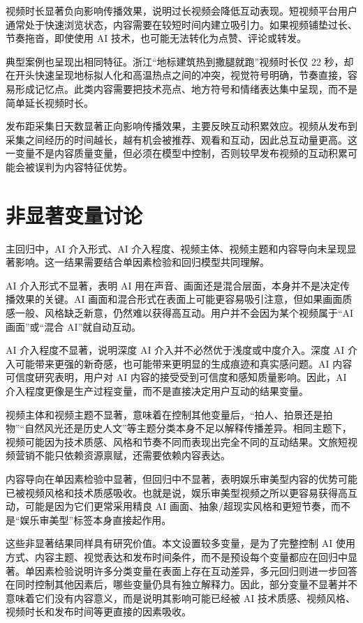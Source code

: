 视频时长显著负向影响传播效果，说明过长视频会降低互动表现。短视频平台用户通常处于快速浏览状态，内容需要在较短时间内建立吸引力。如果视频铺垫过长、节奏拖沓，即使使用 AI 技术，也可能无法转化为点赞、评论或转发。

典型案例也呈现出相同特征。浙江“地标建筑热到撒腿就跑”视频时长仅 22 秒，却在开头快速呈现地标拟人化和高温热点之间的冲突，视觉符号明确，节奏直接，容易形成记忆点。此类内容需要把技术亮点、地方符号和情绪表达集中呈现，而不是简单延长视频时长。

发布距采集日天数显著正向影响传播效果，主要反映互动积累效应。视频从发布到采集之间经历的时间越长，越有机会被推荐、观看和互动，因此总互动量更高。这一变量不是内容质量变量，但必须在模型中控制，否则较早发布视频的互动积累可能会被误判为内容特征优势。

\section{非显著变量讨论}

主回归中，AI 介入形式、AI 介入程度、视频主体、视频主题和内容导向未呈现显著影响。这一结果需要结合单因素检验和回归模型共同理解。

AI 介入形式不显著，表明 AI 用在声音、画面还是混合层面，本身并不是决定传播效果的关键。AI 画面和混合形式在表面上可能更容易吸引注意，但如果画面质感一般、风格缺乏新意，仍然难以获得高互动。用户并不会因为某个视频属于“AI 画面”或“混合 AI”就自动互动。

AI 介入程度不显著，说明深度 AI 介入并不必然优于浅度或中度介入。深度 AI 介入可能带来更强的新奇感，也可能带来更明显的生成痕迹和真实感问题。AI 内容可信度研究表明，用户对 AI 内容的接受受到可信度和感知质量影响\cite{lit14}。因此，AI 介入程度更像是生产过程变量，而不是直接决定用户互动的结果变量。

视频主体和视频主题不显著，意味着在控制其他变量后，“拍人、拍景还是拍物”“自然风光还是历史人文”等主题分类本身不足以解释传播差异。相同主题下，视频可能因为技术质感、风格和节奏不同而表现出完全不同的互动结果。文旅短视频营销不能只依赖资源禀赋，还需要依赖内容表达。

内容导向在单因素检验中显著，但回归中不显著，表明娱乐审美型内容的优势可能已被视频风格和技术质感吸收。也就是说，娱乐审美型视频之所以更容易获得高互动，可能是因为它们更常采用精良 AI 画面、抽象/超现实风格和更短节奏，而不是“娱乐审美型”标签本身直接起作用。

这些非显著结果同样具有研究价值。本文设置较多变量，是为了完整控制 AI 使用方式、内容主题、视觉表达和发布时间条件，而不是预设每个变量都应在回归中显著。单因素检验说明许多分类变量在表面上存在互动差异，多元回归则进一步回答在同时控制其他因素后，哪些变量仍具有独立解释力。因此，部分变量不显著并不意味着它们没有内容意义，而是说明其影响可能已经被 AI 技术质感、视频风格、视频时长和发布时间等更直接的因素吸收。


